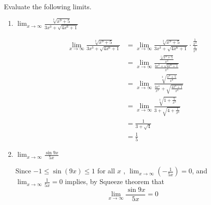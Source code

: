 \documentclass[nooutcomes]{ximera}
\begin{document}
\begin{problem}
Evaluate the following limits.
	\begin{enumerate}
		\item $\lim_{x \to \infty} \frac{\sqrt[3]{x^9+5}}{3x^3+ \sqrt{4x^6+1}}$
		\begin{freeResponse}
		\begin{align*}
		\lim_{x \to \infty} \frac{\sqrt[3]{x^9+5}}{3x^3+ \sqrt{4x^6+1}}
		&=\lim_{x \to \infty} \frac{\sqrt[3]{x^9+5}}{3x^3+ \sqrt{4x^6+1}}\cdot \frac{\frac{1}{x^3}}{\frac{1}{x^3}}\\
		&=\lim_{x \to \infty} \frac{\frac{\sqrt[3]{x^9+5}}{x^3}}{\frac{3x^3+ \sqrt{4x^6+1}}{x^3}}\\
		&=\lim_{x \to \infty}  \frac{\sqrt[3]{\frac{x^9+5}{x^9}}}{\frac{3x^3}{x^3}+ \sqrt{\frac{4x^6+1}{x^6}}}\\
		&=\lim_{x \to \infty}  \frac{\sqrt[3]{1+\frac{5}{x^9}}}{3+ \sqrt{4+\frac{1}{x^6}}}\\
		&=\frac{1}{3+ \sqrt{4}}\\
		&=\frac{1}{5}
		\end{align*}
		\end{freeResponse}

		\item $\lim_{x \to \infty} \frac{\sin{9x}}{5x}$
		\begin{freeResponse}
		 Since $-1 \le  \sin(9x) \le 1$ for all $x$ , $\lim_{x \to \infty} \left(-\frac{1}{5x} \right) = 0$, and $\lim_{x \to \infty} \frac{1}{5x} = 0$ implies, by Squeeze theorem that
        \[
          \lim_{x \to \infty} \frac{\sin{9x}}{5x} = 0
        \]
		\end{freeResponse}
	\end{enumerate}
\end{problem}
\end{document}
